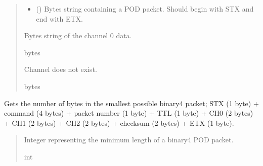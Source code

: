 \documentclass[letterpaper,10pt,english]{sphinxmanual}
\begin{document}
\begin{fulllineitems}
\begin{fulllineitems}
\begin{quote}
\begin{description}
\begin{itemize}
\item {} 
\sphinxAtStartPar
{} () \textendash{} Bytes string containing a POD packet. Should begin with STX and                 end with ETX.

\end{itemize}

\sphinxAtStartPar
Bytes string of the channel 0 data.

\sphinxAtStartPar
bytes

\sphinxAtStartPar
Channel does not exist.

\sphinxAtStartPar
bytes

\end{description}\end{quote}

\end{fulllineitems}


\begin{fulllineitems}
\label{\detokenize{Morelia.Packets:Morelia.Packets.Binary4.PacketBinary4.GetMinimumLength}}
\pysigstartsignatures
{}
\pysigstopsignatures
\sphinxAtStartPar
Gets the number of bytes in the smallest possible binary4 packet;         STX (1 byte) + command (4 bytes) + packet number (1 byte) + TTL (1 byte) +         CH0 (2 bytes) + CH1 (2 bytes) + CH2 (2 bytes) + checksum (2 bytes) + ETX (1 byte).
\begin{quote}\begin{description}
\sphinxAtStartPar
Integer representing the minimum length of a binary4 POD packet.

\sphinxAtStartPar
int

\end{description}\end{quote}

\end{fulllineitems}



\end{fulllineitems}
\end{document}
